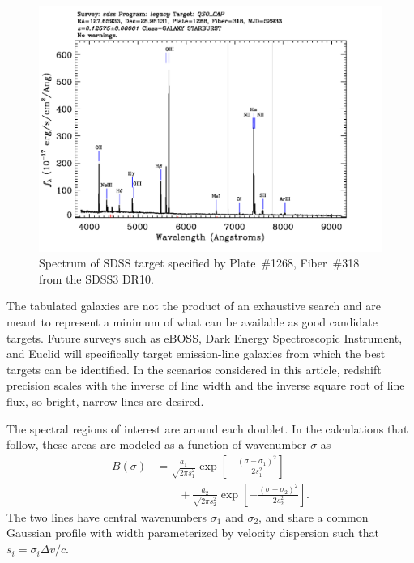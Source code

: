 \documentclass[preprint2, 10pt]{aastex}
\begin{document}
\begin{figure}[t]
   \centering
    \includegraphics[width=\columnwidth]{SpecById.pdf} 
   \caption{Spectrum of SDSS target specified by Plate~\#1268, Fiber~\#318 from the SDSS3 DR10.  \label{shsinput:fig}}
\end{figure}


The tabulated galaxies are not the product of an exhaustive search and are meant to represent a minimum of what can be available
as good
candidate targets.
Future surveys such as eBOSS, Dark Energy Spectroscopic Instrument, and Euclid will specifically target emission-line
galaxies from which the best targets can be identified.  In the scenarios considered in this article, redshift precision scales
with the inverse of
line width and the inverse square root of line flux, so bright, narrow lines 
are desired. 

The spectral regions of interest
are around each doublet.  In the calculations that follow, these areas are modeled as a function of wavenumber $\sigma$ as
\begin{align}
B(\sigma)& =\frac{a_1}{\sqrt{2\pi s_1^2}}\exp{\left[-\frac{\left(\sigma-\sigma_1\right)^2}{2s_1^2}\right]} \nonumber\\
 &\qquad +\frac{a_2}{\sqrt{2\pi s_2^2}}\exp{\left[-\frac{\left(\sigma-\sigma_2\right)^2}{2s_2^2}\right]}.
\label{input:eqn}
\end{align}
The two lines have central wavenumbers $\sigma_1$ and $\sigma_2$, and share a common Gaussian profile with width parameterized by velocity dispersion
such that $s_i=\sigma_i\Delta v/c$. 
\end{document}
